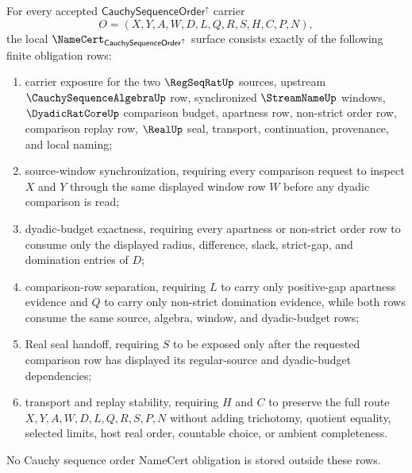 \begin{theorem}
\label{thm:cauchy-sequence-order-namecert-obligations}
For every accepted $\mathsf{CauchySequenceOrder}^{\uparrow}$ carrier
$$
O=(X,Y,A,W,D,L,Q,R,S,H,C,P,N),
$$
the local $\NameCert_{\mathsf{CauchySequenceOrder}^{\uparrow}}$ surface consists exactly of the following finite obligation rows:
\begin{enumerate}
\item carrier exposure for the two $\RegSeqRatUp$ sources, upstream $\CauchySequenceAlgebraUp$ row, synchronized $\StreamNameUp$ windows, $\DyadicRatCoreUp$ comparison budget, apartness row, non-strict order row, comparison replay row, $\RealUp$ seal, transport, continuation, provenance, and local naming;
\item source-window synchronization, requiring every comparison request to inspect $X$ and $Y$ through the same displayed window row $W$ before any dyadic comparison is read;
\item dyadic-budget exactness, requiring every apartness or non-strict order row to consume only the displayed radius, difference, slack, strict-gap, and domination entries of $D$;
\item comparison-row separation, requiring $L$ to carry only positive-gap apartness evidence and $Q$ to carry only non-strict domination evidence, while both rows consume the same source, algebra, window, and dyadic-budget rows;
\item Real seal handoff, requiring $S$ to be exposed only after the requested comparison row has displayed its regular-source and dyadic-budget dependencies;
\item transport and replay stability, requiring $H$ and $C$ to preserve the full route $X,Y,A,W,D,L,Q,R,S,P,N$ without adding trichotomy, quotient equality, selected limits, host real order, countable choice, or ambient completeness.
\end{enumerate}
No Cauchy sequence order NameCert obligation is stored outside these rows.
\end{theorem}
